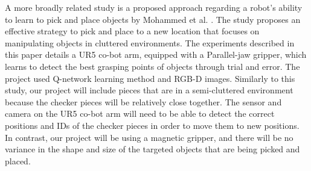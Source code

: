 A more broadly related study is a proposed approach regarding a robot's ability to learn to pick and place objects by Mohammed et al. \cite{Mohammed2021}. The study proposes an effective strategy to pick and place to a new location that focuses on manipulating objects in cluttered environments. The experiments described in this paper details a UR5 co-bot arm, equipped with a Parallel-jaw gripper, which learns to detect the best grasping points of objects through trial and error. The project used Q-network learning method and RGB-D images. Similarly to this study, our project will include pieces that are in a semi-cluttered environment because the checker pieces will be relatively close together. The sensor and camera on the UR5 co-bot arm will need to be able to detect the correct positions and IDs of the checker pieces in order to move them to new positions. In contrast, our project will be using a magnetic gripper, and there will be no variance in the shape and size of the targeted objects that are being picked and placed.  

